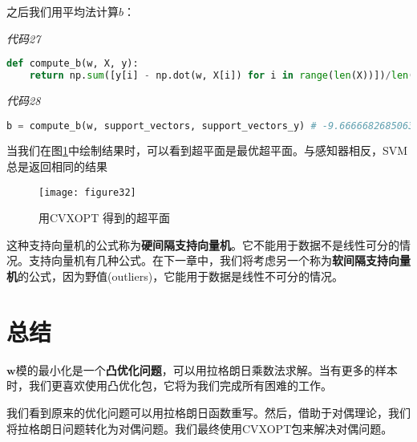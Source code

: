 之后我们用平均法计算$b$：

\emph{代码27}
\begin{lstlisting}[language=python]
def compute_b(w, X, y): 
    return np.sum([y[i] - np.dot(w, X[i]) for i in range(len(X))])/len(X)

\end{lstlisting}

\emph{代码28}
\begin{lstlisting}[language=python]
b = compute_b(w, support_vectors, support_vectors_y) # -9.666668268506335
\end{lstlisting}

当我们在图\ref{figure32}中绘制结果时，可以看到超平面是最优超平面。与感知器相反，SVM总是返回相同的结果

\begin{figure}[ht]
	\centering
	\texttt{[image: figure32]}
	\caption{用CVXOPT 得到的超平面}
	\label{figure32}
\end{figure}

这种支持向量机的公式称为\textbf{硬间隔支持向量机}。它不能用于数据不是线性可分的情况。支持向量机有几种公式。在下一章中，我们将考虑另一个称为\textbf{软间隔支持向量机}的公式，因为野值(outliers)，它能用于数据是线性不可分的情况。


\section{总结}

$\mathbf{w}$模的最小化是一个\textbf{凸优化问题}，可以用拉格朗日乘数法求解。当有更多的样本时，我们更喜欢使用凸优化包，它将为我们完成所有困难的工作。

我们看到原来的优化问题可以用拉格朗日函数重写。然后，借助于对偶理论，我们将拉格朗日问题转化为对偶问题。我们最终使用CVXOPT包来解决对偶问题。